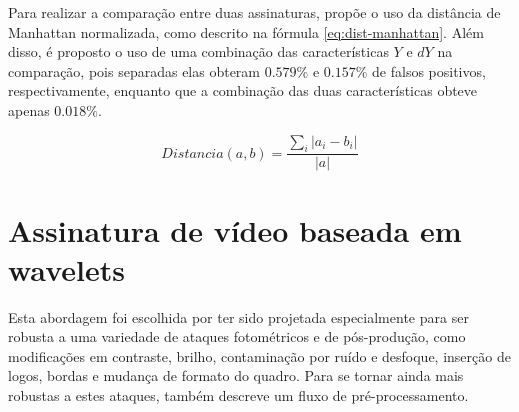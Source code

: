 Para realizar a comparação entre duas assinaturas, \citeauthor{cook2011efficient} propõe o uso da distância de Manhattan normalizada, como descrito na fórmula \ref{eq:dist-manhattan}. Além disso, é proposto o uso de uma combinação das características $Y$ e $dY$ na comparação, pois separadas elas obteram $0.579\%$ e $0.157\%$ de falsos positivos, respectivamente, enquanto que a combinação das duas características obteve apenas $0.018\%$. 

\begin{equation}
  Distancia(a,b) = \frac{\sum_i|a_i - b_i|}{|a|}
  \label{eq:dist-manhattan}
\end{equation}


    

    
%
%

\section{Assinatura de vídeo baseada em wavelets}

Esta abordagem foi escolhida por ter sido projetada especialmente para ser robusta a uma variedade de ataques fotométricos e de pós-produção, como modificações em contraste, brilho, contaminação por ruído e desfoque, inserção de logos, bordas e mudança de formato do quadro. Para se tornar ainda mais robustas a estes ataques, \citeauthor{Dutta2013} também descreve um fluxo de pré-processamento. %

